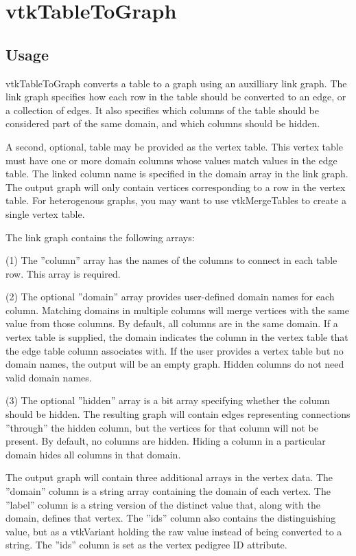 \section{vtkTableToGraph}

\subsection{Usage}

 vtkTableToGraph converts a table to a graph using an auxilliary 
 link graph.  The link graph specifies how each row in the table
 should be converted to an edge, or a collection of edges.  It also
 specifies which columns of the table should be considered part of
 the same domain, and which columns should be hidden.

 A second, optional, table may be provided as the vertex table.
 This vertex table must have one or more domain columns whose values
 match values in the edge table.  The linked column name is specified in
 the domain array in the link graph.  The output graph will only contain
 vertices corresponding to a row in the vertex table.  For heterogenous
 graphs, you may want to use vtkMergeTables to create a single vertex table.

 The link graph contains the following arrays:

 (1) The ''column'' array has the names of the columns to connect in each table row.
 This array is required.

 (2) The optional ''domain'' array provides user-defined domain names for each column.
 Matching domains in multiple columns will merge vertices with the same
 value from those columns.  By default, all columns are in the same domain.
 If a vertex table is supplied, the domain indicates the column in the vertex
 table that the edge table column associates with.  If the user provides a
 vertex table but no domain names, the output will be an empty graph.
 Hidden columns do not need valid domain names.

 (3) The optional ''hidden'' array is a bit array specifying whether the column should be
 hidden.  The resulting graph will contain edges representing connections
 ''through'' the hidden column, but the vertices for that column will not 
 be present.  By default, no columns are hidden.  Hiding a column
 in a particular domain hides all columns in that domain.

 The output graph will contain three additional arrays in the vertex data.
 The ''domain'' column is a string array containing the domain of each vertex.
 The ''label'' column is a string version of the distinct value that, along
 with the domain, defines that vertex. The ''ids'' column also contains
 the distinguishing value, but as a vtkVariant holding the raw value instead
 of being converted to a string. The ''ids'' column is set as the vertex pedigree
 ID attribute.

